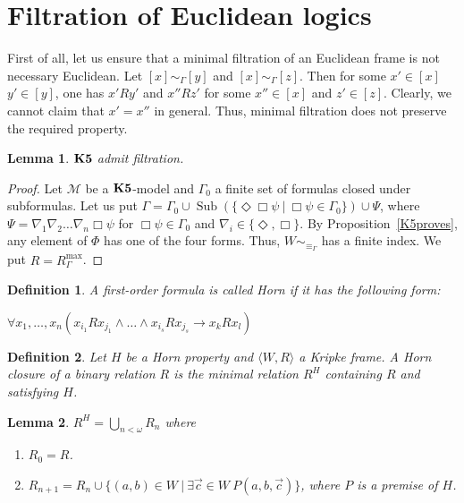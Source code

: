 \documentclass[a4paper]{article}
\theoremstyle{defin}
\newtheorem{defin}{Definition}
\theoremstyle{theorem}
\theoremstyle{prop}
\theoremstyle{lemma}
\newtheorem{lemma}{Lemma}
\theoremstyle{fact}
\theoremstyle{ex}
\theoremstyle{col}
\begin{document}
\section{Filtration of Euclidean logics}

First of all, let us ensure that a minimal filtration of an Euclidean frame is not necessary Euclidean.
Let $[x] \sim_{\Gamma} [y]$ and $[x] \sim_{\Gamma} [z]$. Then for some $x' \in [x]$ $y' \in [y]$, one has
$x' R y'$ and $x'' R z'$ for some $x'' \in [x]$ and $z' \in [z]$. Clearly, we cannot claim that $x' = x''$ in general. Thus, minimal filtration does not preserve the required property.

\begin{lemma}
  ${\bf K5}$ admit filtration.
\end{lemma}

\begin{proof}
  Let $\mathcal{M}$ be a ${\bf K5}$-model and $\Gamma_0$ a finite set of formulas closed under subformulas.
  Let us put $\Gamma = \Gamma_0 \cup \operatorname{Sub}(\{ \Diamond \Box \psi \: | \: \Box \psi \in \Gamma_0 \}) \cup \Psi$, where $\Psi = \nabla_1 \nabla_2 \dots \nabla_n \Box \psi$ for $\Box \psi \in \Gamma_0$ and
  $\nabla_i \in \{ \Diamond, \Box \}$. By Proposition~\ref{K5proves}, any element of $\Phi$ has one of the four forms. Thus, $W \sim_{\equiv_{\Gamma}}$ has a finite index.
  We put $\widehat{R} = R^{\operatorname{max}}_{\Gamma}$.
\end{proof}

\begin{defin} A first-order formula is called Horn if it has the following form:

  \begin{center}
    $\forall x_1, \dots, x_n (x_{i_1} R x_{j_1} \land \dots \land x_{i_s} R x_{j_s} \rightarrow x_k R x_l)$
  \end{center}
\end{defin}

\begin{defin}
  Let $H$ be a Horn property and $\langle W, R \rangle$ a Kripke frame. A Horn closure of a binary relation $R$ is the minimal relation $R^{H}$ containing $R$ and satisfying $H$.
\end{defin}

\begin{lemma}
  $R^{H} = \bigcup \limits_{n < \omega} R_n$ where

  \begin{enumerate}
    \item $R_0 = R$.
    \item $R_{n + 1} = R_n \cup \{ (a, b) \in W \: | \: \exists \vec{c} \in W \: P(a, b, \vec{c})\}$, where $P$ is a premise of $H$.
  \end{enumerate}
\end{lemma}
\end{document}

